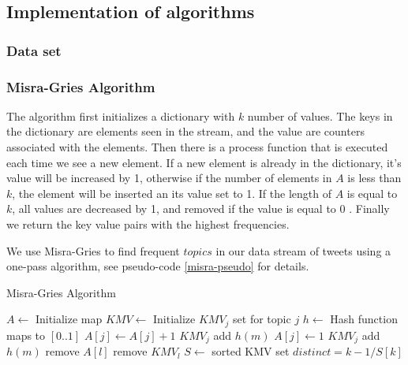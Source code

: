 

\subsection{Implementation of algorithms}

\subsubsection{Data set}\label{algo-data}

\subsubsection{Misra-Gries Algorithm}\label{misra-gries}
The algorithm first initializes a dictionary with $k$ number of values. The keys in the dictionary are elements seen in the stream, and the value are counters associated with the elements. Then there is a process function that is executed each time we see a new element. If a new element is already in the dictionary, it's value will be increased by 1, otherwise if the number of elements in $A$ is less than $k$, the element will be inserted an its value set to 1. If the length of $A$ is equal to $k$, all values are decreased by 1, and removed if the value is equal to 0 \cite{Amit}. Finally we return the key value pairs with the highest frequencies.

We use Misra-Gries to find frequent $topics$ in our data stream of tweets using a one-pass algorithm, see pseudo-code \ref{misra-pseudo} for details.
\begin{algorithm}
\caption{Misra-Gries Algorithm}\label{misra-pseudo}
\begin{algorithmic}[1]
\State $A\gets$ Initialize map
\State $KMV\gets$ Initialize $KMV_{j}$ set for topic $j$
\State $h\gets$ Hash function maps to $[0..1]$
\Statex
{}
    \State $A[j] \leftarrow A[j] + 1$
    \State $KMV_{j}$ add $h(m)$
    \State $A[j] \leftarrow 1$
    \State $KMV_{j}$ add $h(m)$
\Else
        \State remove $A[l]$
        \State remove $KMV_{l}$
        \EndIf
    \EndFor
\EndIf
\EndFunction
\Statex
{}
\State $S\gets$ sorted KMV set
\State $distinct = k-1/S[k]$
\EndFunction
\end{algorithmic}
\end{algorithm}
